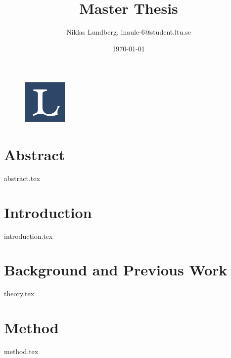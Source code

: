 \documentclass{article}
\title{Master Thesis}
\date{\today}
\author{Niklas Lundberg, inaule-6@student.ltu.se}
\begin{document}
\begin{figure}[b]
    \centering
    \includegraphics[width=0.2\textwidth]{ltulogo.png}
    \label{fig:LTULogga}
\end{figure}

\maketitle
\thispagestyle{empty}
\newpage


\section{Abstract}
{abstract.tex}

\newpage
\tableofcontents 
\newpage

\section{Introduction}
{introduction.tex}


\section{Background and Previous Work}
{theory.tex}


\section{Method}
{method.tex}
\end{document}
